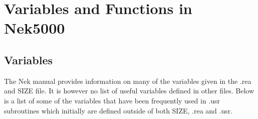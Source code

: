 
\chapter{Variables and Functions in Nek5000} %

\label{AppendixB} %


\section{Variables}

The Nek manual provides information on many of the variables given in the .rea and SIZE
file. It is however no list of useful variables defined in other files. Below is a list of
some of the variables that have been frequently used in .usr subroutines which initially are 
defined outside of both SIZE, .rea and .usr. 


